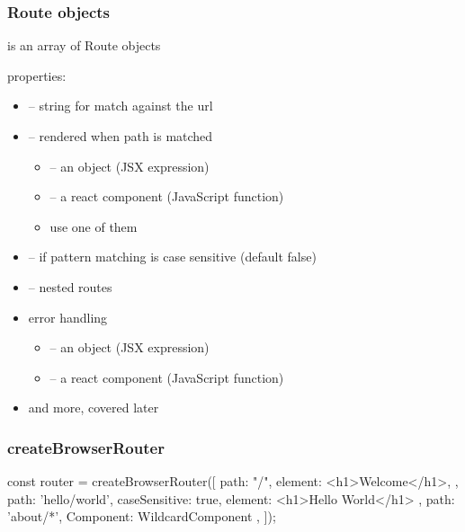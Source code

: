 \begin{frame}[fragile] \frametitle{Route objects}
 is an array of Route objects

properties:
\begin{itemize}
  \item {} -- string for match against the url
  \item {}  -- rendered when path is matched
  \begin{itemize}
    \item {} -- an object (JSX expression)
    \item {} -- a react component (JavaScript function)
    \item use one of them
  \end{itemize}
  \item {}  -- if pattern matching is case sensitive (default false)
  \item {} -- nested routes
  \item error handling
  \begin{itemize}
    \item {} -- an object (JSX expression)
    \item {} -- a react component (JavaScript function)
  \end{itemize}
  \item and more, covered later
\end{itemize}
\end{frame}

\begin{frame}[fragile] \frametitle{createBrowserRouter}
\begin{CodeBox}{}
const router = createBrowserRouter([
  {
    path: "/",
    element: <h1>Welcome</h1>,
  }, {
    path: 'hello/world',
    caseSensitive: true,
    element: <h1>Hello World</h1>
  }, {
    path: 'about/*',
    Component: {WildcardComponent}
  },
]);

\end{CodeBox}
\end{frame}


